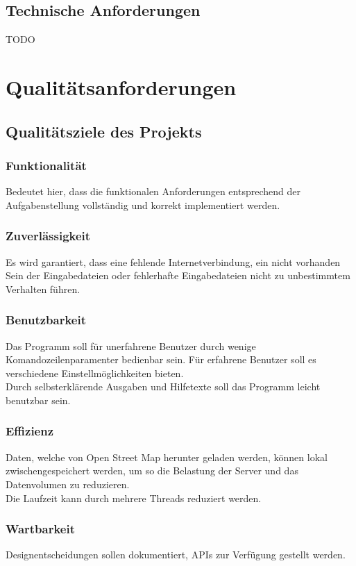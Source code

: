 \subsection{Technische Anforderungen}
TODO
\section{Qualitätsanforderungen}
\subsection{Qualitätsziele des Projekts}
\subsubsection{Funktionalität}
Bedeutet hier, dass die funktionalen Anforderungen entsprechend der Aufgabenstellung vollständig und korrekt implementiert werden.

\subsubsection{Zuverlässigkeit}
Es wird garantiert, dass eine fehlende Internetverbindung, ein nicht vorhanden Sein der Eingabedateien oder fehlerhafte Eingabedateien
nicht zu unbestimmtem Verhalten führen.

\subsubsection{Benutzbarkeit}
Das Programm soll für unerfahrene Benutzer durch wenige Komandozeilenparamenter bedienbar sein. Für erfahrene Benutzer soll es
verschiedene Einstellmöglichkeiten bieten.\\
Durch selbsterklärende Ausgaben und Hilfetexte soll das Programm leicht benutzbar sein.

\subsubsection{Effizienz}
Daten, welche von Open Street Map herunter geladen werden, können lokal zwischengespeichert werden, um so die Belastung der Server und 
das Datenvolumen zu reduzieren.\\
Die Laufzeit kann durch mehrere Threads reduziert werden.

\subsubsection{Wartbarkeit}
Designentscheidungen sollen dokumentiert, APIs zur Verfügung gestellt werden. 

